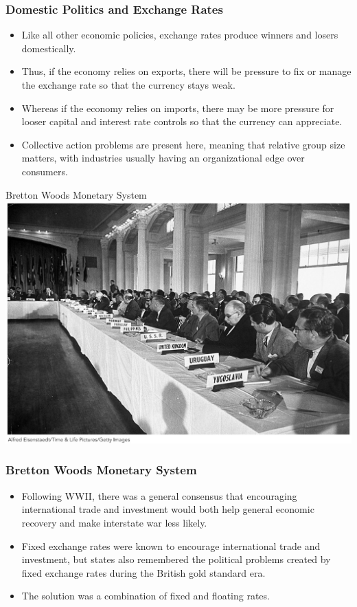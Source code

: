 \documentclass[handout]{beamer}
\begin{document}
\begin{frame} 
	\frametitle{\LARGE{Domestic Politics and Exchange Rates}}
	\begin{itemize}
		\item Like all other economic policies, exchange rates produce winners and losers domestically. \pause 
		\item Thus, if the economy relies on exports, there will be pressure to fix or manage the exchange rate so that the currency stays weak. \pause 
		\item Whereas if the economy relies on imports, there may be more pressure for looser capital and interest rate controls so that the currency can appreciate. \pause
		\item Collective action problems are present here, meaning that relative group size matters, with industries usually having an organizational edge over consumers. 
	\end{itemize}
\end{frame}

\begin{frame}{\LARGE Bretton Woods Monetary System}
	\centering
	\includegraphics[width=\textwidth,height=0.8\textheight,keepaspectratio]{Brettonwoods.jpg}
\end{frame}

\begin{frame} 
	\frametitle{\LARGE{Bretton Woods Monetary System}}
	\begin{itemize}
		\item Following WWII, there was a general consensus that encouraging international trade and investment would both help general economic recovery and make interstate war less likely. \pause
		\item Fixed exchange rates were known to encourage international trade and investment, but states also remembered the political problems created by fixed exchange rates during the British gold standard era.	\pause
		\item The solution was a combination of fixed and floating rates.
	\end{itemize}
\end{frame}
\end{document}
